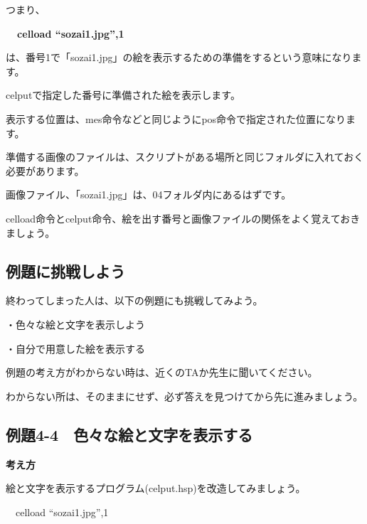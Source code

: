 \documentclass[a4paper,12pt]{jarticle}
\begin{document}
\bigskip
\bigskip
\bigskip

つまり、

\bigskip

{\bfseries
\ \ celload “sozai1.jpg”,1}

\bigskip

は、番号1で「sozai1.jpg」の絵を表示するための準備をするという意味になります。

celputで指定した番号に準備された絵を表示します。

表示する位置は、mes命令などと同じようにpos命令で指定された位置になります。

準備する画像のファイルは、スクリプトがある場所と同じフォルダに入れておく必要があります。

画像ファイル、「sozai1.jpg」は、04フォルダ内にあるはずです。


\bigskip

celload命令とcelput命令、絵を出す番号と画像ファイルの関係をよく覚えておきましょう。

\bigskip
\bigskip
\bigskip

\subsection{例題に挑戦しよう}

\bigskip
\bigskip

終わってしまった人は、以下の例題にも挑戦してみよう。

\bigskip

・色々な絵と文字を表示しよう

・自分で用意した絵を表示する


\bigskip

例題の考え方がわからない時は、近くのTAか先生に聞いてください。

わからない所は、そのままにせず、必ず答えを見つけてから先に進みましょう。

\clearpage
\subsection{例題4-4　色々な絵と文字を表示する}
\bigskip
\bigskip

{\bfseries
考え方}

\bigskip

絵と文字を表示するプログラム(celput.hsp)を改造してみましょう。


\bigskip

\ \ celload “sozai1.jpg”,1


\bigskip
\end{document}
